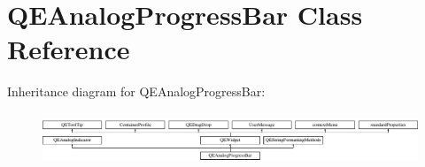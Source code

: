 \hypertarget{classQEAnalogProgressBar}{
\section{QEAnalogProgressBar Class Reference}
\label{classQEAnalogProgressBar}
}
Inheritance diagram for QEAnalogProgressBar:\begin{figure}[H]
\begin{center}
\leavevmode
\includegraphics[height=1.573034cm]{classQEAnalogProgressBar}
\end{center}
\end{figure}
